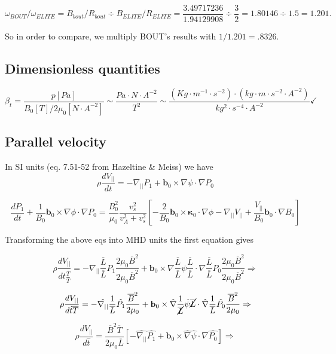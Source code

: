 \documentclass[12pt, a4paper]{article}
\newcommand{\Bbar}{\overline{B}}
\newcommand{\Lbar}{\overline{L}}
\newcommand{\Tbar}{\overline{T}}
\begin{document}
\[
\omega_{BOUT}/\omega_{ELITE}=B_{bout}/R_{bout} \div B_{ELITE} / R_{ELITE}=\frac{3.49717236}{1.94129908} \div \frac{3}{2} =
1.80146 \div 1.5 = 1.201.
\]

So in order to compare, we multiply BOUT's results with $1/1.201=.8326$.

\subsection{Dimensionless quantities}

\[
\beta_t=\frac{p [Pa]}{B_0[T]/{2 \mu_0[N\cdot A^{-2}]}} \sim \frac{Pa \cdot N \cdot A^{-2}}{T^2} \sim \frac{(Kg \cdot m^{-1} \cdot s^{-2}) \cdot (kg \cdot m \cdot s^{-2} \cdot A^{-2})}{kg^2 \cdot s^{-4} \cdot A^{-2}} \checkmark
\]

 

\subsection{Parallel velocity}
\label{sec:parvel}

In SI units (eq. 7.51-52 from Hazeltine \& Meiss) we have
\[
\rho\frac{dV_{||}}{dt} = -\nabla_{||} P_1 + \mathbf{b}_0\times\nabla\psi\cdot\nabla P_0
\]

\[
\frac{dP_1}{dt} + \frac{1}{B_0}\mathbf{b}_0\times\nabla\phi\cdot\nabla P_0 = \frac{B_0^2}{\mu_0}\frac{v_s^2}{v_A^2 + v_s^2}\left[-\frac{2}{B_0}\mathbf{b}_0\times\mathbf{\kappa}_0\cdot\nabla\phi - \nabla_{||} V_{||} + \frac{V_{||}}{B_0}\mathbf{b}_0\cdot\nabla B_0\right] 
\]


Transforming the above eqs into MHD units the first equation gives

\[
\rho\frac{dV_{||}}{dt \frac{\Tbar}{\Tbar}} = -\nabla_{||}\frac{\Lbar}{\Lbar} P_1 \frac{2 \mu_0 \Bbar^2}{2 \mu_0 \Bbar^2}+ \mathbf{b}_0\times\nabla \frac{\Lbar}{\Lbar}  \psi \frac{\Lbar}{\Lbar} \cdot\nabla \frac{\Lbar}{\Lbar} P_0  \frac{2 \mu_0 \Bbar^2}{2 \mu_0 \Bbar^2} \Rightarrow
\]

\[
\rho\frac{dV_{||}}{d\hat{t} \Tbar} = -\hat{\nabla_{||}}\frac{1}{\Lbar} \hat{P_1} \frac{\Bbar^2}{2 \mu_0}+ \mathbf{b}_0\times\hat{\nabla} \frac{1}{\cancel{\Lbar}}  \hat{\psi} \cancel{\Lbar} \cdot \hat{\nabla} \frac{1}{\Lbar} \hat{P_0}  \frac{\Bbar^2}{2 \mu_0} \Rightarrow
\]

\[
\rho\frac{dV_{||}}{d\hat{t}} =  \frac{\Bbar^2\Tbar}{2 \mu_0 \Lbar}  \left[ -\hat{\nabla_{||}}\hat{P_1} + \mathbf{b}_0\times\hat{\nabla}  \hat{\psi} \cdot \hat{\nabla} \hat{P_0} \right ] \Rightarrow
\]
\end{document}
